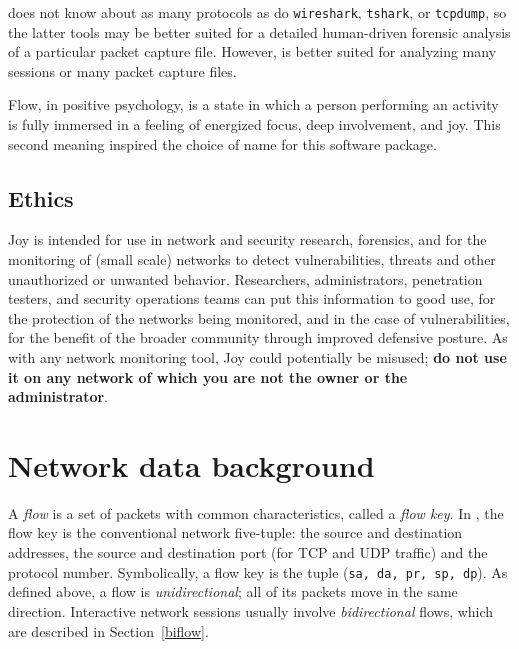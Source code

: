 \documentclass{book}
\begin{document}
 does not know about as many protocols as do
\texttt{wireshark}, \texttt{tshark}, or \texttt{tcpdump}, so the
latter tools may be better suited for a detailed human-driven forensic
analysis of a particular packet capture file.  However, 
is better suited for analyzing many sessions or many packet capture
files.


Flow, in positive psychology, is a state in which a person
performing an activity is fully immersed in a feeling of energized
focus, deep involvement, and joy.  This second meaning inspired
the choice of name for this software package.

\subsection{Ethics}
Joy is intended for use in network and security research, forensics,
and for the monitoring of (small scale) networks to detect
vulnerabilities, threats and other unauthorized or unwanted behavior.
Researchers, administrators, penetration testers, and security
operations teams can put this information to good use, for the
protection of the networks being monitored, and in the case of
vulnerabilities, for the benefit of the broader community through
improved defensive posture.  As with any network monitoring tool, Joy
could potentially be misused; \textbf{do not use it on any network of
  which you are not the owner or the administrator}.

%




\section{Network data background}
A \textit{flow} is a set of packets with common characteristics,
called a \textit{flow key}. In , the flow key is the
conventional network five-tuple: the source and destination addresses,
the source and destination port (for TCP and UDP traffic) and the
protocol number.  Symbolically, a flow key is the tuple (\texttt{sa,
  da, pr, sp, dp}).  As defined above, a flow is
\textit{unidirectional}; all of its packets move in the same
direction.  Interactive network sessions usually involve
\textit{bidirectional} flows, which are described in Section~\ref{biflow}.
\end{document}

